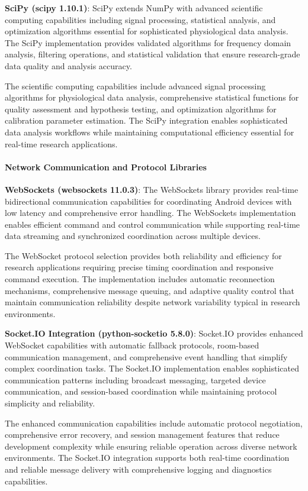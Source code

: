 \documentclass[12pt,a4paper]{report}
\begin{document}
\textbf{SciPy (scipy 1.10.1)}: SciPy extends NumPy with advanced scientific computing capabilities including signal
processing, statistical analysis, and optimization algorithms essential for sophisticated physiological data analysis.
The SciPy implementation provides validated algorithms for frequency domain analysis, filtering operations, and
statistical validation that ensure research-grade data quality and analysis accuracy.

The scientific computing capabilities include advanced signal processing algorithms for physiological data analysis,
comprehensive statistical functions for quality assessment and hypothesis testing, and optimization algorithms for
calibration parameter estimation. The SciPy integration enables sophisticated data analysis workflows while maintaining
computational efficiency essential for real-time research applications.

\paragraph{Network Communication and Protocol Libraries}

\textbf{WebSockets (websockets 11.0.3)}: The WebSockets library provides real-time bidirectional communication capabilities
for coordinating Android devices with low latency and comprehensive error handling. The WebSockets implementation
enables efficient command and control communication while supporting real-time data streaming and synchronized
coordination across multiple devices.

The WebSocket protocol selection provides both reliability and efficiency for research applications requiring precise
timing coordination and responsive command execution. The implementation includes automatic reconnection mechanisms,
comprehensive message queuing, and adaptive quality control that maintain communication reliability despite network
variability typical in research environments.

\textbf{Socket.IO Integration (python-socketio 5.8.0)}: Socket.IO provides enhanced WebSocket capabilities with automatic
fallback protocols, room-based communication management, and comprehensive event handling that simplify complex
coordination tasks. The Socket.IO implementation enables sophisticated communication patterns including broadcast
messaging, targeted device communication, and session-based coordination while maintaining protocol simplicity and
reliability.

The enhanced communication capabilities include automatic protocol negotiation, comprehensive error recovery, and
session management features that reduce development complexity while ensuring reliable operation across diverse network
environments. The Socket.IO integration supports both real-time coordination and reliable message delivery with
comprehensive logging and diagnostics capabilities.
\end{document}

